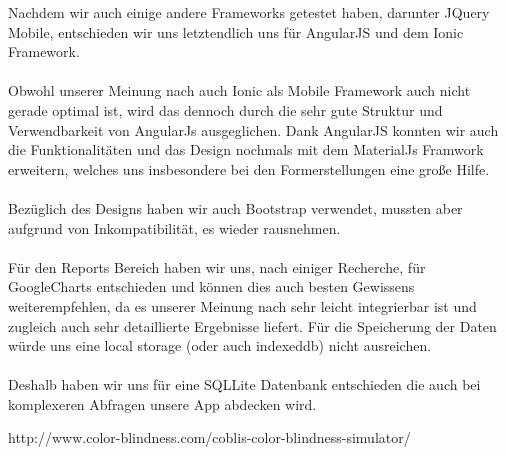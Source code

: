 \documentclass[runningheads,a4paper]{llncs}
\begin{document}
Nachdem wir auch einige andere Frameworks getestet haben, darunter JQuery Mobile, entschieden wir uns letztendlich uns für AngularJS und dem Ionic Framework.\\\\ Obwohl unserer Meinung nach auch Ionic als Mobile Framework auch nicht gerade optimal ist, wird das dennoch durch die sehr gute Struktur und Verwendbarkeit von AngularJs ausgeglichen. Dank AngularJS konnten wir auch die Funktionalitäten und das Design nochmals mit dem MaterialJs Framwork erweitern, welches uns insbesondere bei den Formerstellungen eine große Hilfe.\\\\ Bezüglich des Designs haben wir auch Bootstrap verwendet, mussten aber aufgrund von Inkompatibilität, es wieder rausnehmen. \\\\ Für den Reports Bereich haben wir uns, nach einiger Recherche, für GoogleCharts entschieden und können dies auch besten Gewissens weiterempfehlen, da es unserer Meinung nach sehr leicht integrierbar ist und zugleich auch sehr detaillierte Ergebnisse liefert. Für die Speicherung der Daten würde uns eine local storage (oder auch indexeddb) nicht ausreichen.\\\\ Deshalb haben wir uns für eine SQLLite Datenbank entschieden die auch bei komplexeren Abfragen unsere App abdecken wird. 

\begin{thebibliography}{1}
 http://www.color-blindness.com/coblis-color-blindness-simulator/
\end{thebibliography}
\end{document}
